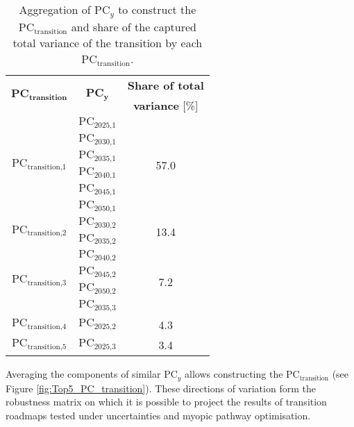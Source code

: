 \begin{table}[htbp!]
\caption{Aggregation of $\text{PC}_y$ to construct the $\text{PC}_{\text{transition}}$ and share of the captured total variance of the transition by each $\text{PC}_{\text{transition}}$.}
\label{tab:PC_transition_aggregation}
\centering
\begin{tabular}{c c c}
\toprule
 \multirow{2}{*}{$\mathbf{\textbf{PC}_{\textbf{transition}}}$} & \multirow{2}{*}{$\mathbf{\textbf{PC}_{\textbf{y}}}$} & \textbf{Share of total} \\	
 &  & \textbf{variance} [\%] \\	
 \midrule
\multirow{6}{*}{$\text{PC}_{\text{transition,1}}$} & $\text{PC}_{\text{2025,1}}$ & \multirow{6}{*}{57.0}\\
& $\text{PC}_{\text{2030,1}}$ & \\
& $\text{PC}_{\text{2035,1}}$ & \\
& $\text{PC}_{\text{2040,1}}$ & \\
& $\text{PC}_{\text{2045,1}}$ & \\
& $\text{PC}_{\text{2050,1}}$ & \\
 \midrule
\multirow{2}{*}{$\text{PC}_{\text{transition,2}}$} & $\text{PC}_{\text{2030,2}}$ & \multirow{2}{*}{13.4}\\
& $\text{PC}_{\text{2035,2}}$ & \\
\midrule
\multirow{4}{*}{$\text{PC}_{\text{transition,3}}$} & $\text{PC}_{\text{2040,2}}$ & \multirow{4}{*}{7.2}\\
& $\text{PC}_{\text{2045,2}}$ & \\
& $\text{PC}_{\text{2050,2}}$ & \\
& $\text{PC}_{\text{2035,3}}$ & \\
 \midrule
$\text{PC}_{\text{transition,4}}$ & $\text{PC}_{\text{2025,2}}$ & 4.3\\
 \midrule
$\text{PC}_{\text{transition,5}}$ & $\text{PC}_{\text{2025,3}}$ & 3.4\\
\bottomrule							

\end{tabular}
\end{table}

Averaging the components of similar $\text{PC}_y$ allows constructing the $\text{PC}_{\text{transition}}$ (see Figure \ref{fig:Top5_PC_transition}). These directions of variation form the robustness matrix on which it is possible to project the results of transition roadmaps tested under uncertainties and myopic pathway optimisation.

